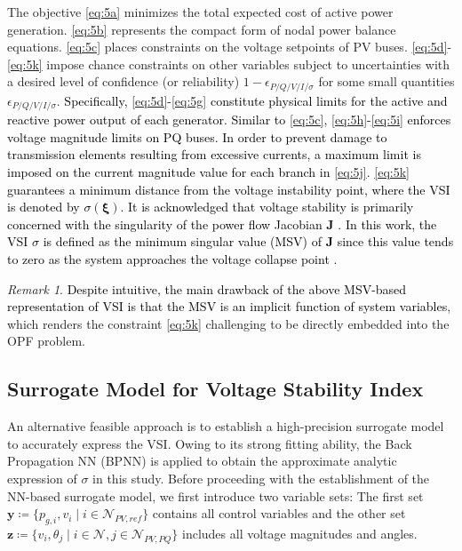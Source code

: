 \documentclass[journal]{IEEEtran}
\theoremstyle{definition}
\theoremstyle{remark}
\newtheorem{remark}{Remark}
\begin{document}
The objective \eqref{eq:5a} minimizes the total expected cost of active power generation. \eqref{eq:5b} represents the compact form of nodal power balance equations. \eqref{eq:5c} places constraints on the voltage setpoints of PV buses. \eqref{eq:5d}-\eqref{eq:5k} impose chance constraints on other variables subject to uncertainties 
with a desired level of confidence (or reliability)
$1-\epsilon_{P/Q/V/I/\sigma}$ for some small quantities $\epsilon_{P/Q/V/I/\sigma}$. \textcolor{black}{Specifically, \eqref{eq:5d}-\eqref{eq:5g} constitute physical limits for the active and reactive power output of each generator. Similar to \eqref{eq:5c}, \eqref{eq:5h}-\eqref{eq:5i} enforces voltage magnitude limits on PQ buses. In order to prevent damage to transmission elements resulting from excessive currents, a maximum limit is imposed on the current magnitude value for each branch in \eqref{eq:5j}. \eqref{eq:5k} guarantees a minimum distance from the voltage instability point, where the VSI is denoted by $\sigma(\boldsymbol{\xi})$. It is acknowledged that voltage stability is primarily concerned with the singularity of the power flow Jacobian $\boldsymbol{J}$ \textcolor{black}{\cite{bompard1996dynamic}}. In this work, the VSI $\sigma$ is defined as the minimum singular value (MSV) of $\boldsymbol{J}$ since this value tends to zero as the system approaches the voltage collapse point \textcolor{black}{\cite{lof1992fast}}.}
\begin{remark}
    \textcolor{black}{Despite intuitive, the main drawback of the above MSV-based representation of VSI is that the MSV is an implicit function of system variables}, which renders the constraint \eqref{eq:5k} challenging to be directly embedded into the OPF problem.
\end{remark}
\subsection{Surrogate Model for Voltage Stability Index}
An alternative feasible approach is to establish a high-precision surrogate model to accurately express the VSI. Owing to its strong fitting ability, the Back Propagation NN (BPNN) is applied to obtain the approximate analytic expression of $\sigma$ in this study. 
Before proceeding with the establishment of the NN-based surrogate model, we first introduce two variable sets: The first set $\boldsymbol{y}\coloneqq\{p_{g,i},v_i\mid i\in\mathcal{N}_{PV,ref}\}$ contains all control variables and the other set $\boldsymbol{z}\coloneqq\{v_i,\theta_j\mid i\in\mathcal{N},j\in\mathcal{N}_{PV,PQ}\}$ includes all voltage magnitudes and angles.  
\end{document}
